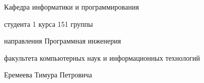 


\begin{flushright}
    Кафедра информатики и программирования
\end{flushright}


\begin{flushleft}
студента 1 курса 151 группы

направления Программная инженерия

факультета компьютерных наук и информационных технологий

Еремеева Тимура Петровича
\end{flushleft}


\clearpage